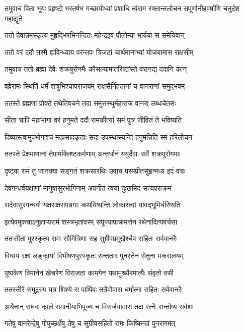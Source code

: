 \threelineshloka
{तमुवाच पिता भूयः प्रहृष्टो भरतर्षभ}
{गच्छायोध्यां प्रशाधि त्वंराम रक्तान्तलोचन}
{सपूर्णानीहवर्षाणि चतुर्दश महाद्युते}


\twolineshloka
{ततो देवान्नमस्कृत्य मुहृद्भिरभिनन्दितः}
{महेन्द्रइव पौलोम्या भार्यया स समेयिवान्}


\twolineshloka
{ततो वरं ददौ तस्मै ह्यविन्ध्याय परन्तपः}
{त्रिजटां चार्थमानाभ्यां योजयामास राक्षसीम्}


\twolineshloka
{तमुवाच ततो ब्रह्मा देवैः शक्रषुरोगमैः}
{कौसल्यामातरिष्टांस्ते वरानद्य ददानि कान्}


\twolineshloka
{वव्रेरामः स्थितिं धर्मे शत्रुभिश्चापराजयम्}
{राक्षसैर्निहतानां च वानराणां समुद्भवम्}


\twolineshloka
{ततस्ते ब्रह्मणा प्रोक्ते तथेतिवचने तदा}
{समुत्तस्थुर्महाराज वानरा लब्धचेतसः}


\twolineshloka
{सीता चापि महाभागा वरं हनुमते ददौ}
{रामकीर्त्या समं पुत्र जीवितं ते भविष्यति}


\twolineshloka
{दिव्यास्त्वामुपभोगाश्च मत्प्रसादकृताः सदा}
{उपस्थास्यन्ति हनुमन्निति स्म हरिलोचन}


\twolineshloka
{ततस्ते प्रेक्षमाणानां तेपामक्लिष्टकर्मणाम्}
{अन्तर्धानं ययुर्देवाः सर्वे शक्रपुरोगमाः}


\twolineshloka
{दृष्ट्वा रामं तु जानक्या सङ्गतं शक्रसारथिः}
{उवाच परमप्रीतसुहृन्मध्य इदं वचः}


\twolineshloka
{देवगन्धर्वयक्षाणां मानुषासुरभोगिनाम्}
{अपनीतं त्वया दुःखमिदं सत्यपराक्रम}


\twolineshloka
{सदेवासुरगन्धर्वा यक्षराक्षसपन्नगाः}
{कथयिष्यन्ति लोकास्त्वां यावद्भूमिर्धरिष्यति}


\twolineshloka
{इत्येवमुक्त्वाऽनुज्ञाप्यरामं शस्त्रभृतांवरम्}
{सपूज्यापाक्रमत्तेन रथेनादित्यवर्चसा}


\twolineshloka
{ततःसीतां पुरस्कृत्य रामः सौमित्रिणा सह}
{सुग्रीवप्रमुखैश्चैव सहितः सर्ववानरैः}


\twolineshloka
{विधाय रक्षां लङ्कायां विभीषणपुरस्कृतः}
{सन्ततार पुनस्तेन सेतुना मकरालयम्}


\twolineshloka
{पुष्पकेण विमानेन खेचरेण विराजता}
{कामगेन यथामुख्यैरमात्यैः संवृतो वसी}


\twolineshloka
{ततस्तीरे समुद्रस्य यत्र शिश्ये स पार्थिवः}
{तत्रैवोवास धर्मात्मा सहितः सर्ववानरैः}


\twolineshloka
{अथैनान् राघवः काले समानीयाभिपूज्य च}
{विसर्जयामास तदा रत्नैः सन्तोष्य सर्वशः}


\twolineshloka
{गतेषु वानरेन्द्रेषु गोपुच्छर्क्षेषु तेषु च}
{सुग्रीवसहितो रामः किष्किन्दां पुनरागमत्}


